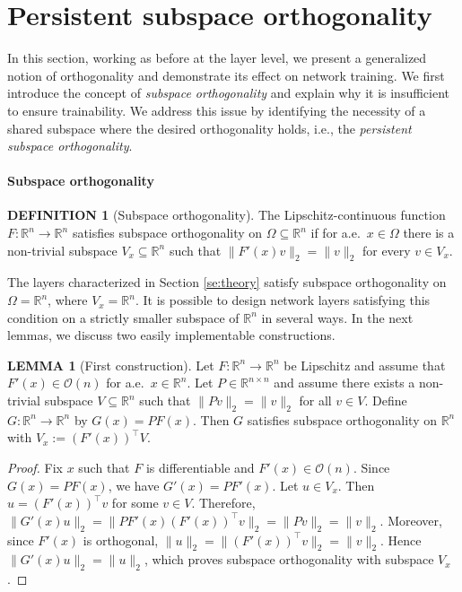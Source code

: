 \documentclass{article}
\theoremstyle{plain}
\theoremstyle{definition}
\newtheorem{definition}[theorem]{DEFINITION}
\theoremstyle{definition}
\newtheorem{lemma}[theorem]{LEMMA}
\theoremstyle{remark}
\theoremstyle{definition}
\theoremstyle{definition}
\theoremstyle{remark}
\numberwithin{equation}{section}
\begin{document}
\section{Persistent subspace orthogonality}\label{se:PSO}
In this section, working as before at the layer level, we present a generalized notion of orthogonality and demonstrate its effect on network training. We first introduce the concept of \textit{subspace orthogonality} and explain why it is insufficient to ensure trainability. We address this issue by identifying the necessity of a shared subspace where the desired orthogonality holds, i.e., the \textit{persistent subspace orthogonality}.

\paragraph{Subspace orthogonality}
\begin{definition}[Subspace orthogonality]
The Lipschitz-continuous function $F:\mathbb{R}^n\to\mathbb{R}^n$ satisfies subspace orthogonality on $\Omega\subseteq\mathbb{R}^n$ if for a.e.\, $x\in\Omega$ there is a non-trivial subspace $V_x\subseteq \mathbb{R}^n$ such that $\|F'(x)v\|_2 = \|v\|_2$ for every $v\in V_x$.
\end{definition}
The layers characterized in Section \ref{se:theory} satisfy subspace orthogonality on $\Omega=\mathbb{R}^n$, where $V_x=\mathbb{R}^n$. It is possible to design network layers satisfying this condition on a strictly smaller subspace of $\mathbb{R}^n$ in several ways. In the next lemmas, we discuss two easily implementable constructions.
\begin{lemma}[First construction]\label{lem:first-construction}
Let $F:\mathbb{R}^n\to\mathbb{R}^n$ be Lipschitz and assume that $F'(x)\in\mathcal{O}(n)$ for a.e.\, $x\in\mathbb{R}^n$. 
Let $P\in\mathbb{R}^{n\times n}$ and assume there exists a non-trivial subspace $V\subseteq\mathbb{R}^n$ such that $\|Pv\|_2=\|v\|_2$ for all $v\in V$. Define $G:\mathbb{R}^n\to\mathbb{R}^n$ by $G(x)=PF(x)$. Then $G$ satisfies subspace orthogonality on $\mathbb{R}^n$ with $V_x := (F'(x))^\top V$.
\end{lemma}
\begin{proof}
Fix $x$ such that $F$ is differentiable and $F'(x)\in\mathcal{O}(n)$. Since $G(x)=PF(x)$, we have $G'(x)=PF'(x)$. 
Let $u\in V_x$. Then $u=(F'(x))^\top v$ for some $v\in V$. Therefore, $\|G'(x)u\|_2
=\|PF'(x)(F'(x))^\top v\|_2=\|Pv\|_2=\|v\|_2$.
Moreover, since $F'(x)$ is orthogonal, $\|u\|_2=\|(F'(x))^\top v\|_2=\|v\|_2$. Hence $\|G'(x)u\|_2=\|u\|_2$, which proves subspace orthogonality with subspace $V_x$.
\end{proof}
\end{document}
